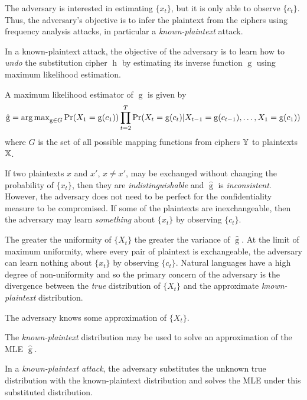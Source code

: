 \documentclass[final,
  11pt,
]{article}
\begin{document}
\label{sec:threat}
The adversary is interested in estimating \(\{x_t\}\), but it is only
able to observe \(\{c_t\}\). Thus, the adversary's objective is to infer
the plaintext from the ciphers using frequency analysis attacks, in
particular a \emph{known-plaintext} attack.

In a known-plaintext attack, the objective of the adversary is to learn
how to \emph{undo} the substitution cipher \(\operatorname{h}\) by estimating
its inverse function \(\operatorname{g}\) using maximum likelihood estimation.

A maximum likelihood estimator of \(\operatorname{g}\) is given by \[
    \hat{\operatorname{g}} = \operatorname{arg\,max}_{\operatorname{g} \in G}
    \Pr(X_1 = \operatorname{g}(c_1)) \prod_{t=2}^{T} \Pr(X_t =
    \operatorname{g}(c_t) | X_{t-1} = \operatorname{g}(c_{t-1}),
            \ldots, X_1 = \operatorname{g}(c_1))
\] where \(G\) is the set of all possible mapping functions from ciphers
\(\mathbb{Y}\) to plaintexts \(\mathbb{X}\).

If two plaintexts $x$ and $x'$, $x \neq x'$, may be exchanged
without changing the probability of \(\{x_t\}\), then they are
\emph{indistinguishable} and \(\hat{\operatorname{g}}\) is
\emph{inconsistent}. However, the adversary does not need to be perfect
for the confidentiality measure to be compromised. If some of the
plaintexts are inexchangeable, then the adversary may learn
\emph{something} about \(\{x_t\}\) by observing \(\{c_t\}\).

The greater the uniformity of \(\{X_t\}\) the greater the variance of
\(\hat{\operatorname{g}}\). At the limit of maximum uniformity, where
every pair of plaintext is exchangeable, the adversary can learn nothing
about \(\{x_t\}\) by observing \(\{c_t\}\). Natural languages have a
high degree of non-uniformity and so the primary concern of the
adversary is the divergence between the \emph{true} distribution of $\{X_t\}$ and the
approximate \emph{known-plaintext} distribution.

\begin{assumption}
The adversary knows some approximation of $\{X_t\}$.
\end{assumption}

The \emph{known-plaintext} distribution may be used to solve an
approximation of the MLE \(\hat{\operatorname{g}}\).

\begin{definition}
In a \emph{known-plaintext attack}, the adversary substitutes the unknown true
distribution with the known-plaintext distribution and solves the MLE under
this substituted distribution.
\end{definition}
\end{document}
